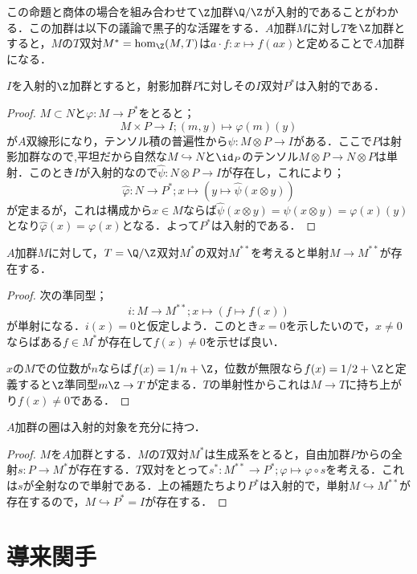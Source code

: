 この命題と商体の場合を組み合わせて$\Z$加群$\Q/\Z$が入射的であることがわかる．この加群は以下の議論で黒子的な活躍をする．$A$加群$M$に対し$T$を$\Z$加群とすると，$M$の$T$双対$M^\ast=\hom_{\Z}(M,T)$は$a\cdot f:x\mapsto f(ax)$と定めることで$A$加群になる．
\begin{lem}
	$I$を入射的$\Z$加群とすると，射影加群$P$に対しその$I$双対$P^\ast$は入射的である．
\end{lem}
\begin{proof}
	$M\subset N$と$\varphi:M\to P^\ast$をとると；
	\[M\times P\to I;(m,y)\mapsto \varphi(m)(y)\]
	が$A$双線形になり，テンソル積の普遍性から$\psi:M\otimes P\to I$がある．ここで$P$は射影加群なので,平坦だから自然な$M\hookrightarrow N$と$\id_P$のテンソル$M\otimes P\to N\otimes P$は単射．このとき$I$が入射的なので$\hat\psi:N\otimes P\to I$が存在し，これにより；
	\[\hat\varphi:N\to P^\ast; x\mapsto (y\mapsto \hat\psi(x\otimes y))\]
	が定まるが，これは構成から$x\in M$ならば$\hat\psi(x\otimes y)=\psi(x\otimes y)=\varphi(x)(y)$となり$\hat\varphi(x)=\varphi(x)$となる．よって$P^\ast$は入射的である．
\end{proof}
\begin{lem}
	$A$加群$M$に対して，$T=\Q/\Z$双対$M^\ast$の双対$M^{\ast\ast}$を考えると単射$M\to M^{\ast\ast}$が存在する．
\end{lem}
\begin{proof}
	次の準同型；
	\[i:M\to M^{\ast\ast};x\mapsto (f\mapsto f(x))\]
	が単射になる．$i(x)=0$と仮定しよう．このとき$x=0$を示したいので，$x\neq0$ならばある$f\in M^\ast$が存在して$f(x)\neq0$を示せば良い．
	
	$x$の$M$での位数が$n$ならば$f(x)=1/n+\Z$，位数が無限なら$f(x)=1/2+\Z$と定義すると$\Z$準同型$m\Z\to T$が定まる．$T$の単射性からこれは$M\to T$に持ち上がり$f(x)\neq0$である．
\end{proof}

\begin{thm}\label{thm:加群の圏はhas enough injectives}
	$A$加群の圏は入射的対象を充分に持つ．
\end{thm}
\begin{proof}
	$M$を$A$加群とする．$M$の$T$双対$M^\ast$は生成系をとると，自由加群$P$からの全射$s:P\to M^\ast$が存在する．$T$双対をとって$s^\ast:M^{\ast\ast}\to P^\ast;\varphi\mapsto\varphi\circ s$を考える．これは$s$が全射なので単射である．上の補題たちより$P^\ast$は入射的で，単射$M\hookrightarrow M^{\ast\ast}$が存在するので，$M\hookrightarrow P^\ast=I$が存在する．
\end{proof}

\section{導来関手}

